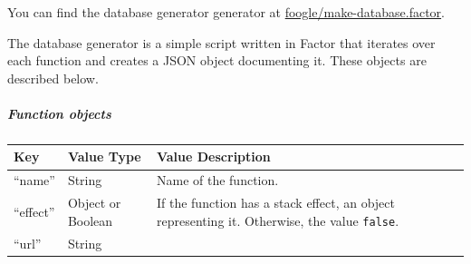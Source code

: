 \documentclass[
]{article}
\begin{document}
You can find the database generator generator at
\href{https://github.com/factor-hmc/foogle/blob/master/make-database.factor}{foogle/make-database.factor}.

The database generator is a simple script written in Factor that
iterates over each function and creates a JSON object documenting it.
These objects are described below.

\hypertarget{function-objects}{%
\subparagraph{Function objects}\label{function-objects}}

\begin{longtable}[]{@{}lll@{}}
\toprule
\begin{minipage}[b]{0.13\columnwidth}\raggedright
Key\strut
\end{minipage} & \begin{minipage}[b]{0.14\columnwidth}\raggedright
Value Type\strut
\end{minipage} & \begin{minipage}[b]{0.64\columnwidth}\raggedright
Value Description\strut
\end{minipage}\tabularnewline
\midrule
\endhead
\begin{minipage}[t]{0.13\columnwidth}\raggedright
``name''\strut
\end{minipage} & \begin{minipage}[t]{0.14\columnwidth}\raggedright
String\strut
\end{minipage} & \begin{minipage}[t]{0.64\columnwidth}\raggedright
Name of the function.\strut
\end{minipage}\tabularnewline
\begin{minipage}[t]{0.13\columnwidth}\raggedright
``effect''\strut
\end{minipage} & \begin{minipage}[t]{0.14\columnwidth}\raggedright
Object or Boolean\strut
\end{minipage} & \begin{minipage}[t]{0.64\columnwidth}\raggedright
If the function has a stack effect, an object representing it.
Otherwise, the value \texttt{false}.\strut
\end{minipage}\tabularnewline
\begin{minipage}[t]{0.13\columnwidth}\raggedright
``url''\strut
\end{minipage} & \begin{minipage}[t]{0.14\columnwidth}\raggedright
String\strut
\end{minipage} & \begin{minipage}[t]{0.64\columnwidth}\raggedright

\end{minipage}
\end{longtable}
\end{document}
